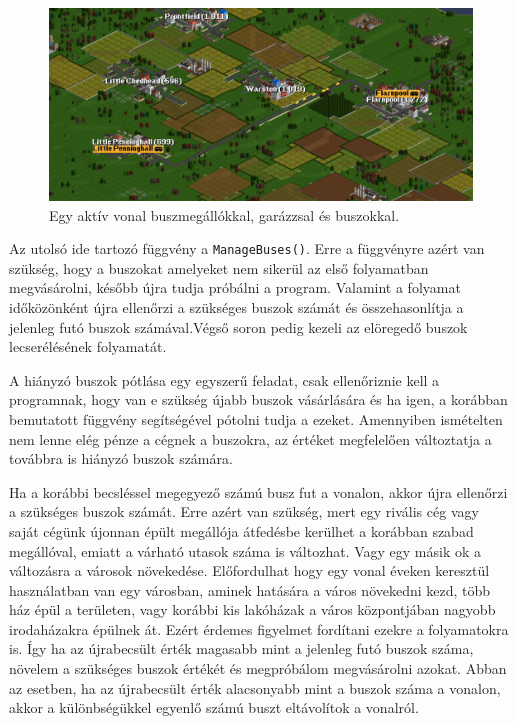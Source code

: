 \begin{figure}[h!]
	\centering
	\includegraphics[scale=0.45]{images/vonal.png}
	\caption{Egy aktív vonal buszmegállókkal, garázzsal és buszokkal.}
	\label{fig:vonal}
\end{figure}

Az utolsó ide tartozó függvény a \texttt{ManageBuses()}. Erre a függvényre azért van szükség, hogy a buszokat amelyeket nem sikerül az első folyamatban megvásárolni, később újra tudja próbálni a program. Valamint a folyamat időközönként újra ellenőrzi a szükséges buszok számát és összehasonlítja a jelenleg futó buszok számával.Végső soron pedig kezeli az elöregedő buszok lecserélésének folyamatát.

A hiányzó buszok pótlása egy egyszerű feladat, csak ellenőriznie kell a programnak, hogy van e szükség újabb buszok vásárlására és ha igen, a korábban bemutatott függvény segítségével pótolni tudja a ezeket. Amennyiben ismételten nem lenne elég pénze a cégnek a buszokra, az értéket megfelelően változtatja a továbbra is hiányzó buszok számára.

Ha a korábbi becsléssel megegyező számú busz fut a vonalon, akkor újra ellenőrzi a szükséges buszok számát. Erre azért van szükség, mert egy rivális cég vagy saját cégünk újonnan épült megállója átfedésbe kerülhet a korábban szabad megállóval, emiatt a várható utasok száma is változhat. Vagy egy másik ok a változásra a városok növekedése. Előfordulhat hogy egy vonal éveken keresztül használatban van egy városban, aminek hatására a város növekedni kezd, több ház épül a területen, vagy korábbi kis lakóházak a város központjában nagyobb irodaházakra épülnek át. Ezért érdemes figyelmet fordítani ezekre a folyamatokra is. Így ha az újrabecsült érték magasabb mint a jelenleg futó buszok száma, növelem a szükséges buszok értékét és megpróbálom megvásárolni azokat. Abban az esetben, ha az újrabecsült érték alacsonyabb mint a buszok száma a vonalon, akkor a különbségükkel egyenlő számú buszt eltávolítok a vonalról.

